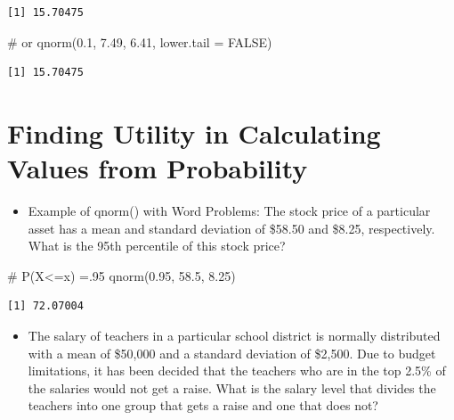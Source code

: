 \documentclass[
  letterpaper,
  DIV=11,
  numbers=noendperiod]{scrreprt}
\newenvironment{Shaded}{\begin{snugshade}}{\end{snugshade}}
\newcommand{\AttributeTok}[1]{\textcolor[rgb]{0.40,0.45,0.13}{#1}}
\newcommand{\CommentTok}[1]{\textcolor[rgb]{0.37,0.37,0.37}{#1}}
\newcommand{\ConstantTok}[1]{\textcolor[rgb]{0.56,0.35,0.01}{#1}}
\newcommand{\FloatTok}[1]{\textcolor[rgb]{0.68,0.00,0.00}{#1}}
\newcommand{\FunctionTok}[1]{\textcolor[rgb]{0.28,0.35,0.67}{#1}}
\newcommand{\NormalTok}[1]{\textcolor[rgb]{0.00,0.23,0.31}{#1}}
\providecommand{\tightlist}{%
  \setlength{\itemsep}{0pt}\setlength{\parskip}{0pt}}\usepackage{longtable,booktabs,array}
\begin{document}
\begin{verbatim}
[1] 15.70475
\end{verbatim}

\begin{Shaded}
\begin{Highlighting}[]
\CommentTok{\# or}
\FunctionTok{qnorm}\NormalTok{(}\FloatTok{0.1}\NormalTok{, }\FloatTok{7.49}\NormalTok{, }\FloatTok{6.41}\NormalTok{, }\AttributeTok{lower.tail =} \ConstantTok{FALSE}\NormalTok{)}
\end{Highlighting}
\end{Shaded}

\begin{verbatim}
[1] 15.70475
\end{verbatim}

\section{Finding Utility in Calculating Values from
Probability}\label{finding-utility-in-calculating-values-from-probability}

\begin{itemize}
\tightlist
\item
  Example of qnorm() with Word Problems: The stock price of a particular
  asset has a mean and standard deviation of \$58.50 and \$8.25,
  respectively. What is the 95th percentile of this stock price?
\end{itemize}

\begin{Shaded}
\begin{Highlighting}[]
\CommentTok{\# P(X\textless{}=x) =.95}
\FunctionTok{qnorm}\NormalTok{(}\FloatTok{0.95}\NormalTok{, }\FloatTok{58.5}\NormalTok{, }\FloatTok{8.25}\NormalTok{)}
\end{Highlighting}
\end{Shaded}

\begin{verbatim}
[1] 72.07004
\end{verbatim}

\begin{itemize}
\tightlist
\item
  The salary of teachers in a particular school district is normally
  distributed with a mean of \$50,000 and a standard deviation of
  \$2,500. Due to budget limitations, it has been decided that the
  teachers who are in the top 2.5\% of the salaries would not get a
  raise. What is the salary level that divides the teachers into one
  group that gets a raise and one that does not?
\end{itemize}
\end{document}
